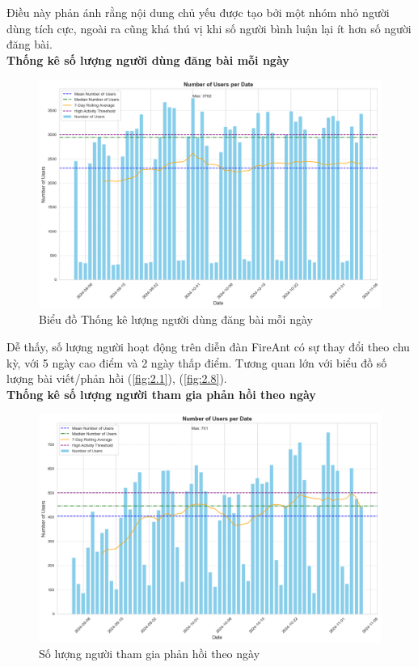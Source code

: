 Điều này phản ánh rằng nội dung chủ yếu được tạo bởi một nhóm nhỏ người dùng tích cực, ngoài ra cũng khá thú vị khi số người bình luận lại ít hơn số người đăng bài.\\

\textbf{Thống kê số lượng người dùng đăng bài mỗi ngày}
\vspace{-1em}
\begin{figure}[H]
    \centering
    \includegraphics[width=0.75\linewidth]{images/C2_pic49.png}
    \vspace{-1.2em}
    \caption{Biểu đồ Thống kê lượng người dùng đăng bài mỗi ngày}
    \label{fig:2.16}
\end{figure}

Dễ thấy, số lượng người hoạt động trên diễn đàn FireAnt có sự thay đổi theo chu kỳ, với 5 ngày cao điểm và 2 ngày thấp điểm. Tương quan lớn với biểu đồ số lượng bài viết/phản hồi (\ref{fig:2.1}), (\ref{fig:2.8}).\\

\textbf{Thống kê số lượng người tham gia phản hồi theo ngày}

\begin{figure}[H]
    \centering
    \includegraphics[width = 0.75\linewidth]{images/C2_pic51.png}
    \vspace{-1.2em}
    \caption{Số lượng người tham gia phản hồi theo ngày}
    \label{fig:2.17}
\end{figure}

